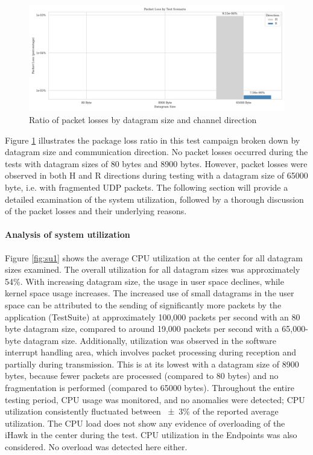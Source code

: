 \documentclass[	a4paper,
				11pt,
				DIV=11,
				bigheadings,
				idxtotoc,
				listof=totoc,	
				bibtotoc,		
				halfparskip,
				cleardoubleempty,
				oneside,
				openright]{scrartcl}
\begin{document}
\begin{figure}[h]
	\includegraphics[width=\textwidth]{fig2.png}
	\centering
	\caption{Ratio of packet losses by datagram size and channel direction}
    \label{fig:fig2}
\end{figure}

Figure \ref{fig:fig2} illustrates the package loss ratio in this test campaign broken down by datagram size and communication direction. No packet losses occurred during the tests with datagram sizes of 80 bytes and 8900 bytes. However, packet losses were observed in both H and R directions during testing with a datagram size of 65000 byte, i.e. with fragmented UDP packets. The following section will provide a detailed examination of the system utilization, followed by a thorough discussion of the packet losses and their underlying reasons.

\paragraph*{Analysis of system utilization}

Figure \ref{fig:su1} shows the average CPU utilization at the center for all datagram sizes examined. The overall utilization for all datagram sizes was approximately 54\%. With increasing datagram size, the usage in user space declines, while kernel space usage increases. The increased use of small datagrams in the user space can be attributed to the sending of significantly more packets by the application (TestSuite) at approximately 100,000 packets per second with an 80 byte datagram size, compared to around 19,000 packets per second with a 65,000-byte datagram size. Additionally, utilization was observed in the software interrupt handling area, which involves packet processing during reception and partially during transmission. This is at its lowest with a datagram size of 8900 bytes, because fewer packets are processed (compared to 80 bytes) and no fragmentation is performed (compared to 65000 bytes).  Throughout the entire testing period, CPU usage was monitored, and no anomalies were detected; CPU utilization consistently fluctuated between \num{\pm 3}\% of the reported average utilization. The CPU load does not show any evidence of overloading of the iHawk in the center during the test. CPU utilization in the Endpoints was also considered. No overload was detected here either.
\end{document}
